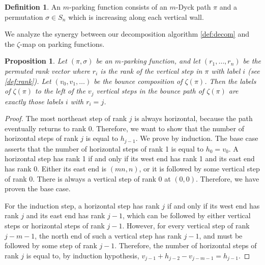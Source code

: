 \documentclass[12pt,reqno]{amsart}
\newtheorem{prop}{Proposition}
\theoremstyle{definition}
\newtheorem{definition}{Definition}
\begin{document}
\begin{definition}
An $m$-parking function consists of an $m$-Dyck path $\pi$ and a permutation $\sigma \in S_n$ which is increasing along each vertical wall.
\end{definition}
We analyze the synergy between our decomposition algorithm \cref{def:decom} and the $\zeta$-map on parking functions.
\begin{prop}
Let $(\pi,\sigma)$ be an $m$-parking function, and let $(r_1,\dots,r_n)$ be the permuted rank vector where $r_i$ is the rank of the vertical step in $\pi$ with label $i$ (see \cref{def:rank}).
Let $(v_0,v_1,\dots)$ be the bounce composition of $\zeta(\pi)$.
Then the labels of $\zeta(\pi)$ to the left of the $v_j$ vertical steps in the bounce path of $\zeta(\pi)$ are exactly those labels $i$ with $r_i = j$.
\end{prop}
\begin{proof}
The most northeast step of rank $j$ is always horizontal, because the path eventually returns to rank 0.
Therefore, we want to show that the number of horizontal steps of rank $j$ is equal to $h_{j-1}$.
We prove by induction.
The base case asserts that the number of horizontal steps of rank 1 is equal to $h_0 = v_0$.
A horizontal step has rank 1 if and only if its west end has rank 1 and its east end has rank 0.
Either its east end is $(mn,n)$, or it is followed by some vertical step of rank 0.
There is always a vertical step of rank 0 at $(0,0)$.
Therefore, we have proven the base case.

For the induction step, a horizontal step has rank $j$ if and only if its west end has rank $j$ and its east end has rank $j-1$, which can be followed by either vertical steps or horizontal steps of rank $j-1$.
However, for every vertical step of rank $j-m-1$, the north end of such a vertical step has rank $j-1$, and must be followed by some step of rank $j-1$.
Therefore, the number of horizontal steps of rank $j$ is equal to, by induction hypothesis, $v_{j-1}+h_{j-2}-v_{j-m-1} = h_{j-1}$.
\end{proof}




\end{document}
